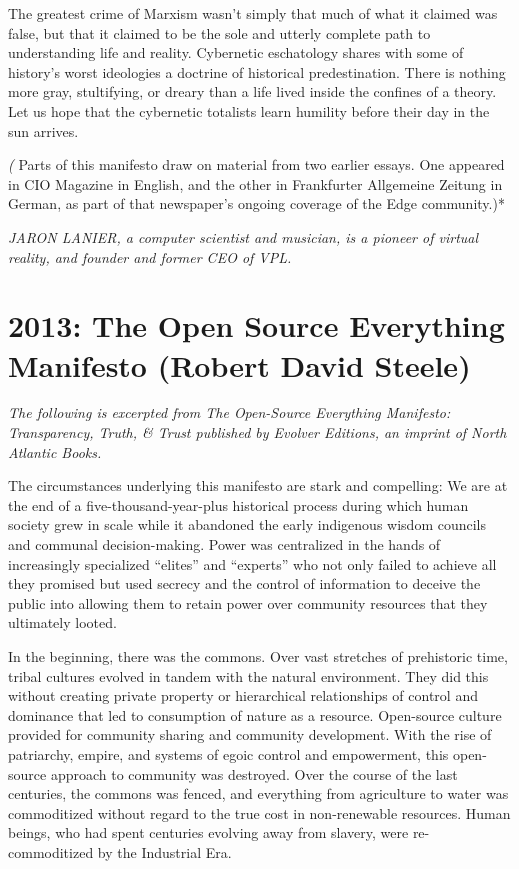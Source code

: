 \documentclass[letterpaper,12pt,english]{sphinxmanual}
\begin{document}
The greatest crime of Marxism wasn't simply that much of what it claimed was false, but that it claimed to be the sole and utterly complete path to understanding life and reality. Cybernetic eschatology shares with some of history's worst ideologies a doctrine of historical predestination. There is nothing more gray, stultifying, or dreary than a life lived inside the confines of a theory. Let us hope that the cybernetic totalists learn humility before their day in the sun arrives.

\emph{(} Parts of this manifesto draw on material from two earlier essays. One appeared in CIO Magazine in English, and the other in Frankfurter Allgemeine Zeitung in German, as part of that newspaper's ongoing coverage of the Edge community.)*

\emph{JARON LANIER, a computer scientist and musician, is a pioneer of virtual reality, and founder and former CEO of VPL.}


\chapter{2013: The Open Source Everything Manifesto (Robert David Steele)}
\label{2013:the-open-source-everything-manifesto-robert-david-steele}\label{2013::doc}
\emph{The following is excerpted from The Open-Source Everything Manifesto:
Transparency, Truth, \& Trust published by Evolver Editions, an imprint of North Atlantic Books.}

The circumstances underlying this manifesto are stark and compelling: We are at the end of a five-thousand-year-plus historical process during which human society grew in scale while it abandoned the early indigenous wisdom councils and communal decision-making. Power was centralized in the hands of increasingly specialized ``elites'' and ``experts'' who not only failed to achieve all they promised but used secrecy and the control of information to deceive the public into allowing them to retain power over community resources that they ultimately looted.

In the beginning, there was the commons. Over vast stretches of prehistoric time, tribal cultures evolved in tandem with the natural environment. They did this without creating private property or hierarchical relationships of control and dominance that led to consumption of nature as a resource. Open-source culture provided for community sharing and community development. With the rise of patriarchy, empire, and systems of egoic control and empowerment, this open-source approach to community was destroyed. Over the course of the last centuries, the commons was fenced, and everything from agriculture to water was commoditized without regard to the true cost in non-renewable resources. Human beings, who had spent centuries evolving away from slavery, were re-commoditized by the Industrial Era.
\end{document}
